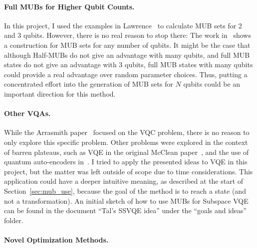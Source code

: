 \documentclass[a4paper,12pt]{article}
\newcommand{\thetas}{\vec{\theta}}
\begin{document}
\paragraph*{Full MUBs for Higher Qubit Counts.}
In this project, I used the examples in Lawrence~\cite{lawrence_mutually_2002} to calculate MUB sets for 2 and 3 qubits. However, there is no real reason to stop there: The work in~\cite{bandyopadhyay_new_2002} shows a construction for MUB sets for any number of qubits.
It might be the case that although Half-MUBs do not give an advantage with many qubits, and full MUB states do not give an advantage with 3 qubits, full MUB states with many qubits could provide a real advantage over random parameter choices.
Thus, putting a concentrated effort into the generation of MUB sets for $N$ qubits could be an important direction for this method.

\paragraph*{Other VQAs.}
While the Arrasmith paper~\cite{arrasmith_effect_2021} focused on the VQC problem, there is no reason to only explore this specific problem.
Other problems were explored in the context of barren plateaus, such as VQE in the original McClean paper~\cite{mcclean_barren_2018}, and the use of quantum auto-encoders in~\cite{cerezo_cost_2021}.
I tried to apply the presented ideas to VQE in this project, but the matter was left outside of scope due to time considerations. This application could have a deeper intuitive meaning, as described at the start of Section~\ref{sec:mub_use}, because the goal of the method is to reach a state (and not a transformation).
An initial sketch of how to use MUBs for Subspace VQE \cite{nakanishi_subspace-search_2019} can be found in the document ``Tal's SSVQE idea'' under the ``goals and ideas'' folder.

\paragraph*{Novel Optimization Methods.}
\end{document}
